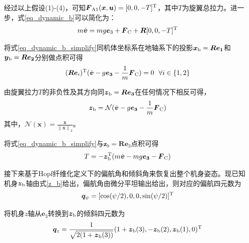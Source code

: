 经过以上假设(1)-(4)，可知${\boldsymbol{F}\rm{_{A1}}}(\boldsymbol{x}, \boldsymbol{u}) = [ 0, 0, -T]\rm{^T}$，其中$T$为旋翼总拉力。进一步，式\ref{eq_dynamic_b}可以简化为：
\begin{equation}\label{eq_dynamic_b_simplify}
    m\dot{ \boldsymbol{v}} = mg\boldsymbol{e}_3 + {\boldsymbol{F}\rm{_C}}+  {\boldsymbol{R}}{[0, 0, -T]\rm{^T}} 
\end{equation}

将式\ref{eq_dynamic_b_simplify}同机体坐标系在地轴系下的投影${\boldsymbol{x}\rm{_b}} = \boldsymbol{Re_1}$和${\boldsymbol{y}\rm{_b}} = \boldsymbol{Re_2} $分别做点积可得
\begin{equation}
    {(\boldsymbol{Re}_i)\rm{^T}}(\dot{\boldsymbol{v}} -g{\boldsymbol{e_3}} - \frac{1}{m}{\boldsymbol{F}\rm{_C}}) = 0 \,\,\,\, \forall i \in \left\{ {1,2} \right\}
\end{equation}

由旋翼拉力$T$的非负性及其方向同${\boldsymbol{z}\rm{_b}} = \boldsymbol{Re_3}$在任何情况下相反可得，
\begin{equation}\label{z_b}
    {\boldsymbol{z}\rm{_b}} = \mathcal{N} (\dot{\boldsymbol{v}} -g{\boldsymbol{e_3}} - \frac{1}{m}{\boldsymbol{F}\rm{_C}})
\end{equation}
其中，$\mathcal{N}(\boldsymbol{x}) = \frac{\boldsymbol{x}}{\left\| {\boldsymbol{x}} \right\|_2}$。

将式\ref{eq_dynamic_b_simplify}与$\boldsymbol{z}_b = \boldsymbol{R}\boldsymbol{e}_3$点积可得
\begin{equation}
    T = -{\boldsymbol{z}\rm{_b^T}} (m\dot{\boldsymbol{v}}  -mg{\boldsymbol{e_3}} - {\boldsymbol{F}\rm{_C}})
\end{equation}

接下来基于Hopf纤维化定义下的偏航角和倾斜角来恢复出整个机身姿态。现已知机身$\boldsymbol{z}\rm{_b}$轴由式\ref{z_b}给出，偏航角由微分平坦输出给出，则对应的偏航四元数为
\begin{equation}
    \boldsymbol{q}_\psi = [\cos(\psi/2), 0, 0, \sin(\psi/2)]\rm{^T}
\end{equation}

将机身$z$轴从$\boldsymbol{e}_3$转换到$\boldsymbol{z}\rm{_b}$的倾斜四元数为
\begin{equation}
    \boldsymbol{q}_z = \frac{1}{\sqrt{2(1+{\boldsymbol{z}\rm{_b}}(3))}}(1+{\boldsymbol{z}\rm{_b}}(3), -{\boldsymbol{z}\rm{_b}}(2), {\boldsymbol{z}\rm{_b}}(1), 0)\rm{^T}
\end{equation}

